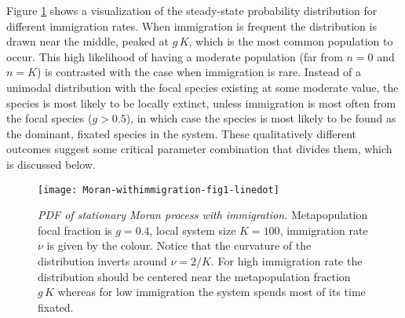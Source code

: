 Figure \ref{stationary-fig2} shows a visualization of the steady-state probability distribution for different immigration rates. %
When immigration is frequent the distribution is drawn near the middle, peaked at $g\,K$, which is the most common population to occur. 
This high likelihood of having a moderate population (far from $n=0$ and $n=K$) is contrasted with the case when immigration is rare. 
Instead of a unimodal distribution with the focal species existing at some moderate value, the species is most likely to be locally extinct, unless immigration is most often from the focal species ($g>0.5$), in which case the species is most likely to be found as the dominant, fixated species in the system. 
These qualitatively different outcomes suggest some critical parameter combination that divides them, which is discussed below. 
\setlength{\unitlength}{1.0cm}
\begin{figure}[h]
	\centering
	\texttt{[image: Moran-withimmigration-fig1-linedot]}
	\caption{\emph{PDF of stationary Moran process with immigration.} Metapopulation focal fraction is $g=0.4$, local system size $K=100$, immigration rate $\nu$ is given by the colour. Notice that the curvature of the distribution inverts around $\nu=2/K$. For high immigration rate the distribution should be centered near the metapopulation fraction $g\,K$ whereas for low immigration the system spends most of its time fixated. } \label{stationary-fig2}
\end{figure}

